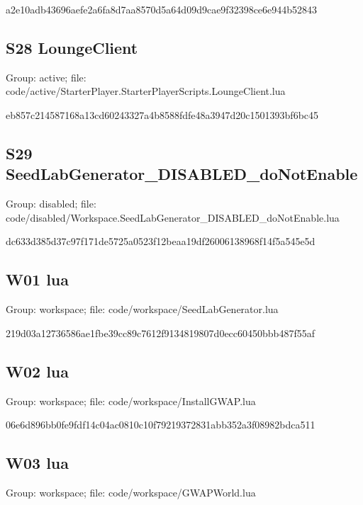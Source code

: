 \begin{flushleft}\ttfamily\footnotesize a2e10adb43696aefe2a6fa8d7aa8570d5a64d09d9cae9f32398ce6e944b52843\end{flushleft}
\subsection{S28 LoungeClient}
Group: active; file: code/\allowbreak{}active/\allowbreak{}StarterPlayer.\allowbreak{}StarterPlayerScripts.\allowbreak{}LoungeClient.\allowbreak{}lua

\begin{flushleft}\ttfamily\footnotesize eb857c214587168a13cd60243327a4b8588fdfe48a3947d20c1501393bf6bc45\end{flushleft}
\subsection{S29 SeedLabGenerator\_\allowbreak{}DISABLED\_\allowbreak{}doNotEnable}
Group: disabled; file: code/\allowbreak{}disabled/\allowbreak{}Workspace.\allowbreak{}SeedLabGenerator\_\allowbreak{}DISABLED\_\allowbreak{}doNotEnable.\allowbreak{}lua

\begin{flushleft}\ttfamily\footnotesize dc633d385d37c97f171de5725a0523f12beaa19df26006138968f14f5a545e5d\end{flushleft}
\subsection{W01 lua}
Group: workspace; file: code/\allowbreak{}workspace/\allowbreak{}SeedLabGenerator.\allowbreak{}lua

\begin{flushleft}\ttfamily\footnotesize 219d03a12736586ae1fbe39cc89c7612f9134819807d0ecc60450bbb487f55af\end{flushleft}
\subsection{W02 lua}
Group: workspace; file: code/\allowbreak{}workspace/\allowbreak{}InstallGWAP.\allowbreak{}lua

\begin{flushleft}\ttfamily\footnotesize 06e6d896bb0fe9fdf14c04ac0810c10f79219372831abb352a3f08982bdca511\end{flushleft}
\subsection{W03 lua}
Group: workspace; file: code/\allowbreak{}workspace/\allowbreak{}GWAPWorld.\allowbreak{}lua

